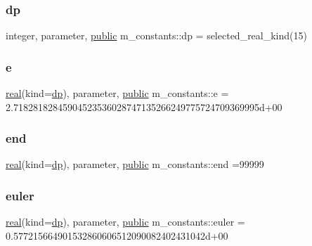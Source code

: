 \subsubsection{\texorpdfstring{dp}{dp}}
{\footnotesize\ttfamily integer, parameter, \hyperlink{M__stopwatch_83_8txt_a2f74811300c361e53b430611a7d1769f}{public} m\+\_\+constants\+::dp = selected\+\_\+real\+\_\+kind(15)}

\mbox{\label{namespacem__constants_a79882cb1d94180e4edaed2f1c683f21b}} 
\subsubsection{\texorpdfstring{e}{e}}
{\footnotesize\ttfamily \hyperlink{read__watch_83_8txt_abdb62bde002f38ef75f810d3a905a823}{real}(kind=\hyperlink{namespacem__constants_a15743b6f1a6f57ab5b842d79fbffdd98}{dp}), parameter, \hyperlink{M__stopwatch_83_8txt_a2f74811300c361e53b430611a7d1769f}{public} m\+\_\+constants\+::e = 2.\+71828182845904523536028747135266249775724709369995d+00}

\mbox{\label{namespacem__constants_a00fa81f5a36d9ea6a2add582ac3b54a6}} 
\subsubsection{\texorpdfstring{end}{end}}
{\footnotesize\ttfamily \hyperlink{read__watch_83_8txt_abdb62bde002f38ef75f810d3a905a823}{real}(kind=\hyperlink{namespacem__constants_a15743b6f1a6f57ab5b842d79fbffdd98}{dp}), parameter, \hyperlink{M__stopwatch_83_8txt_a2f74811300c361e53b430611a7d1769f}{public} m\+\_\+constants\+::end =99999}

\mbox{\label{namespacem__constants_a2dc8df75875a345dc61324f97e7dc780}} 
\subsubsection{\texorpdfstring{euler}{euler}}
{\footnotesize\ttfamily \hyperlink{read__watch_83_8txt_abdb62bde002f38ef75f810d3a905a823}{real}(kind=\hyperlink{namespacem__constants_a15743b6f1a6f57ab5b842d79fbffdd98}{dp}), parameter, \hyperlink{M__stopwatch_83_8txt_a2f74811300c361e53b430611a7d1769f}{public} m\+\_\+constants\+::euler = 0.\+577215664901532860606512090082402431042d+00}

